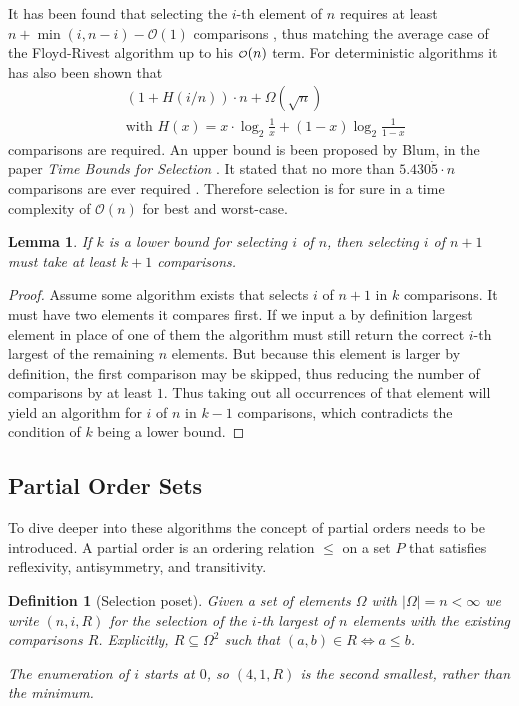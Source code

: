 \documentclass[10pt,journal,compsoc]{IEEEtran}
\newcommand\smallO{
  \mathchoice
    {{\scriptstyle\mathcal{O}}}%
    {{\scriptstyle\mathcal{O}}}%
    {{\scriptscriptstyle\mathcal{O}}}%
    {\scalebox{.50}{$\scriptscriptstyle\mathcal{O}$}}%
  }
\newtheorem{lemma}{Lemma}
\newtheorem{definition}{Definition}
\begin{document}
It has been found that selecting the $i$-th element of $n$ requires at least $n+\min(i,n-i)-\mathcal{O}(1)$ comparisons , thus matching the average case of the Floyd-Rivest algorithm up to his $\smallO(n)$ term.
For deterministic algorithms it has also been shown that
\begin{eqnarray*}
  &\left (1 + H(i/n) \right ) \cdot n + \Omega(\sqrt n) \\
  &\text{with~} H(x) = x \cdot \log_2 \frac{1}{x} + (1-x) \log_2 \frac{1}{1-x}
\end{eqnarray*}
comparisons are required.
An upper bound is been proposed by Blum, in the paper \textit{Time Bounds for Selection} \cite{Blum1972}.
It stated that no more than $5.430\dot{5} \cdot n$ comparisons are ever required .
Therefore selection is for sure in a time complexity of $\mathcal{O}(n)$ for best and worst-case.

\begin{lemma} \label{lemma:previous_next_poset}
  If $k$ is a lower bound for selecting $i$ of $n$, then selecting $i$ of $n + 1$ must take at least $k + 1$ comparisons.
\end{lemma}

\begin{proof}
  Assume some algorithm exists that selects $i$ of $n + 1$ in $k$ comparisons.
  It must have two elements it compares first.
  If we input a by definition largest element in place of one of them the algorithm must still return the correct $i$-th largest of the remaining $n$ elements.
  But because this element is larger by definition, the first comparison may be skipped, thus reducing the number of comparisons by at least $1$.
  Thus taking out all occurrences of that element will yield an algorithm for $i$ of $n$ in $k - 1$ comparisons, which contradicts the condition of $k$ being a lower bound.
\end{proof}

\subsection{Partial Order Sets}
To dive deeper into these algorithms the concept of partial orders needs to be introduced.
A partial order is an ordering relation $\leq$ on a set $P$ that satisfies reflexivity, antisymmetry, and transitivity.

\begin{definition}[Selection poset]
  Given a set of elements $\Omega$ with $|\Omega| = n < \infty$ we write $(n, i, R)$ for the selection of the $i$-th largest of $n$ elements with the existing comparisons $R$.
  Explicitly, $R\subseteq\Omega^2$ such that $(a, b)\in R \Longleftrightarrow a \leq b$.

  The enumeration of $i$ starts at $0$, so $(4, 1, R)$ is the second smallest, rather than the minimum.
\end{definition}
\end{document}
